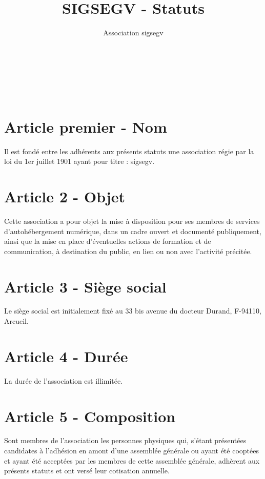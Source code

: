 \documentclass[a4paper,oneside,10pt]{article}
\begin{document}
\author{Association sigsegv}
\date{}
\title{SIGSEGV - Statuts}

{ \\
}
\vspace{5mm}
{\centering {\textbf {\Huge -}}\\
}
\vspace{5mm}
{\\
}

\section*{Article premier - Nom}

Il est fondé entre les adhérents aux présents statuts une association régie par la loi du 1er juillet 1901 ayant pour titre : sigsegv.

\section*{Article 2 - Objet}

Cette association a pour objet la mise à disposition pour ses membres de services d’autohébergement numérique, dans un cadre ouvert et documenté publiquement, ainsi que la mise en place d’éventuelles actions de formation et de communication, à destination du public, en lien ou non avec l'activité précitée.

\section*{Article 3 - Siège social}

Le siège social est initialement fixé au 33 bis avenue du docteur Durand, F-94110, Arcueil.

\section*{Article 4 - Durée}

La durée de l'association est illimitée.

\section*{Article 5 - Composition}

Sont membres de l’association les personnes physiques qui, s'étant présentées candidates à l'adhésion en amont d'une assemblée générale ou ayant été cooptées et ayant été acceptées par les membres de cette assemblée générale, adhèrent aux présents statuts et ont versé leur cotisation annuelle.
\end{document}
